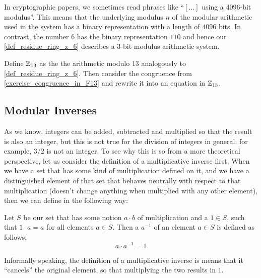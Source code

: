 \begin{remark} In cryptographic papers, we sometimes read phrases like ``$[\ldots]$ using a 4096-bit modulus''. This means that the underlying modulus $n$ of the modular arithmetic used in the system has a binary representation with a length of $4096$ bits. In contrast, the number $6$ has the binary representation $110$ and hence our \examplename{} \ref{def_residue_ring_z_6}
 describes a $3$-bit modulus arithmetic system.
\end{remark}
\begin{exercise}
Define $\mathbb{Z}_{13}$ as the the arithmetic modulo $13$ analogously to \examplename{} \ref{def_residue_ring_z_6}. Then consider the congruence from \exercisename{} \ref{exercise_congruence_in_F13} and rewrite it into an equation in $\mathbb{Z}_{13}$.
\end{exercise}

\subsection{Modular Inverses}
\label{sec:modular_inverses}
As we know, integers can be added, subtracted and multiplied so that the result is also an integer, but this is not true for the division of integers in general: for example, $3/2$ is not an integer. To see why this is so from a more theoretical perspective, let us consider the definition of a multiplicative inverse first. When we have a set that has some kind of multiplication defined on it, and we have a distinguished element of that set that behaves neutrally with respect to that multiplication (doesn't change anything when multiplied with any other element), then we can define  in the following way:

\begin{definition}

Let $S$ be our set that has some notion $a\cdot b$ of multiplication and a  $1\in S$, such that $1\cdot a = a$ for all elements $a\in S$. Then a  $a^{-1}$ of an element $a\in S$ is defined as follows:
\begin{equation}
a\cdot a^{-1} = 1
\end{equation}
\end{definition}
Informally speaking, the definition of a multiplicative inverse is means that it ``cancels'' the original element, so that multiplying the two results in $1$.

